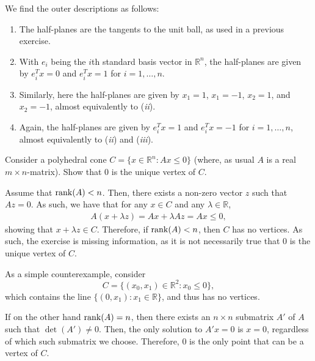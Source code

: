\documentclass[
  a4paper,
  12pt,
]{article}
\numberwithin{equation}{section}
\begin{document}
\begin{solution}
  We find the outer descriptions as follows:
  \begin{enumerate}[label = (\emph{\roman*})]
    \item The half-planes are the tangents to the unit ball, as used in a previous exercise.
    \item With $e_i$ being the $i$th standard basis vector in $\mathbb{R}^n$, the half-planes are given by $e_i^T x = 0$ and $e_i^T x = 1$ for $i = 1, \ldots, n$.
    \item Similarly, here the half-planes are given by $x_1 = 1$, $x_1 = -1$, $x_2 = 1$, and $x_2 = -1$, almost equivalently to (\emph{ii}).
    \item Again, the half-planes are given by $e_i^T x = 1$ and $e_i^T x = -1$ for $i = 1, \ldots, n$, almost equivalently to (\emph{ii}) and (\emph{iii}).
  \end{enumerate}
\end{solution}

\setcounter{section}{4}

\begin{exercise}
  Consider a polyhedral cone $C = \{x \in \mathbb{R}^n : Ax \leq 0\}$ (where, as usual $A$ is a real $m \times n$-matrix).
  Show that $0$ is the unique vertex of $C$.
\end{exercise}

\begin{solution}
  Assume that $\operatorname*{rank}(A) < n$.
  Then, there exists a non-zero vector $z$ such that $Az = 0$.
  As such, we have that for any $x \in C$ and any $\lambda \in \mathbb{R}$,
  \begin{align*}
    A(x + \lambda z) = Ax + \lambda Az = Ax \leq 0,
  \end{align*}
  showing that $x + \lambda z \in C$.
  Therefore, if $\operatorname*{rank}(A) < n$, then $C$ has no vertices.
  As such, the exercise is missing information, as it is not necessarily true that $0$ is the unique vertex of $C$.

  As a simple counterexample, consider
  \begin{equation}
    C = \{ (x_0, x_1) \in \mathbb{R}^2 : x_0 \leq 0 \},
  \end{equation}
  which contains the line $\{ (0, x_1) : x_1 \in \mathbb{R} \}$, and thus has no vertices.

  If on the other hand $\operatorname*{rank}(A) = n$, then there exists an $n \times n$ submatrix $A'$ of $A$ such that $\det(A') \neq 0$.
  Then, the only solution to $A'x = 0$ is $x = 0$, regardless of which such submatrix we choose.
  Therefore, $0$ is the only point that can be a vertex of $C$.
\end{solution}
\end{document}
